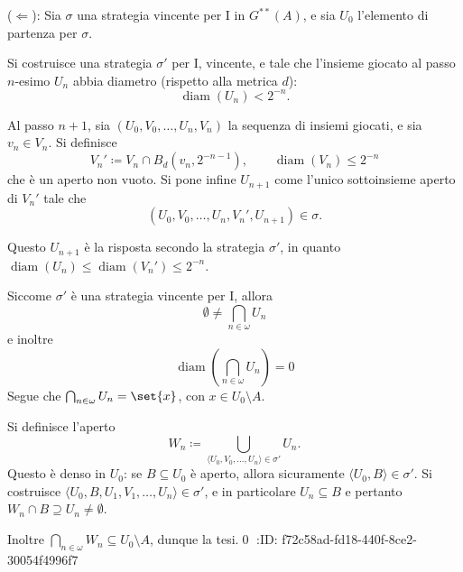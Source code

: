 \documentclass{article}
\newcommand{\1}{\mathds{1}}
\begin{document}
(\(\Leftarrow\)): Sia \(\sigma\) una strategia vincente per I in \(G^{**}(A)\), e sia \(U_{0}\) l'elemento di partenza per \(\sigma\).

Si costruisce una strategia \(\sigma'\) per I, vincente, e tale che l'insieme giocato al passo \(n\)-esimo \(U_{n}\) abbia diametro (rispetto alla metrica \(d\)):
\begin{equation*}
\operatorname{diam}(U_{n})<2^{-n}.
\end{equation*}

Al passo \(n+1\), sia \((U_{0},V_{0},\dots,U_{n}, V_{n})\) la sequenza di insiemi giocati, e sia \(v_{n} \in V_{n}\). Si definisce
\begin{equation*}
V_{n}'\coloneqq V_{n}\cap B_{d}(v_{n}, 2^{-n-1}), \qquad \operatorname{diam}(V_{n}) \le 2^{-n}
\end{equation*}
che è un aperto non vuoto. Si pone infine \(U_{n+1}\) come l'unico sottoinsieme aperto di \(V_{n}'\) tale che
\begin{equation*}
(U_{0},V_{0},\dots,U_{n}, V_{n}', U_{n+1}) \in \sigma.
\end{equation*}

Questo \(U_{n+1}\) è la risposta secondo la strategia \(\sigma'\), in quanto \(\operatorname{diam}(U_{n})\le \operatorname{diam}(V_{n}')\le 2^{-n}\).

Siccome \(\sigma'\) è una strategia vincente per I, allora
\begin{equation*}
\emptyset\neq\bigcap_{n \in \omega} U_{n}
\end{equation*}
e inoltre
\begin{equation*}
\operatorname{diam}\left(\bigcap_{n \in \omega} U_{n}\right) = 0
\end{equation*}
Segue che \(\bigcap_{n \in \omega} U_{n} = \set{x}\), con \(x \in U_{0}\setminus A\).

Si definisce l'aperto
\begin{equation*}
W_{n} \coloneqq \bigcup_{\langle U_{0},V_{0},\dots,U_{n}\rangle \in \sigma'} U_{n}.
\end{equation*}
Questo è denso in \(U_{0}\): se \(B \subseteq U_{0}\) è aperto, allora sicuramente \(\langle U_{0},B\rangle \in \sigma'\). Si costruisce \(\langle U_{0},B,U_{1},V_{1},\dots,U_{n}\rangle \in \sigma'\), e in particolare \(U_{n} \subseteq B\) e pertanto \(W_{n}\cap B\supseteq U_{n}\neq\emptyset\).

Inoltre \(\bigcap_{n \in \omega} W_{n} \subseteq U_{0}\setminus A\), dunque la tesi.\qed
:ID:       f72c58ad-fd18-440f-8ce2-30054f4996f7
\end{document}
